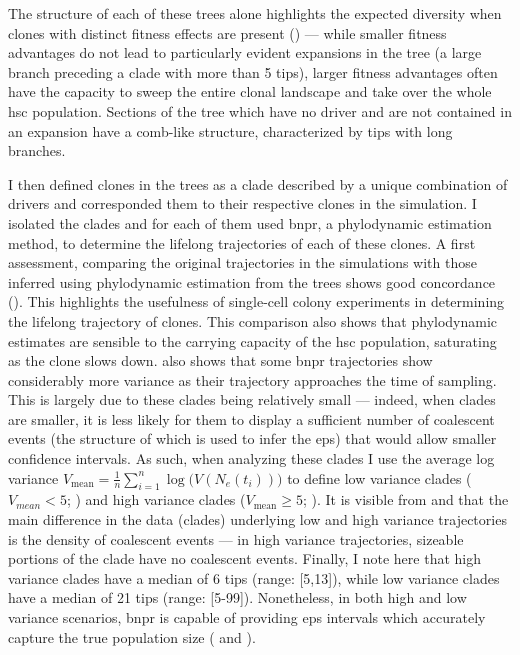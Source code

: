 The structure of each of these trees alone highlights the expected diversity when clones with distinct fitness effects are present () --- while smaller fitness advantages do not lead to particularly evident expansions in the tree (a large branch preceding a clade with more than 5 tips), larger fitness advantages often have the capacity to sweep the entire clonal landscape and take over the whole \ac{hsc} population. Sections of the tree which have no driver and are not contained in an expansion have a comb-like structure, characterized by tips with long branches.

\begin{figure}[!ht]
	\label{fig:trees-simulated-examples}
\end{figure}

I then defined clones in the trees as a clade described by a unique combination of drivers and corresponded them to their respective clones in the simulation. I isolated the clades and for each of them used \ac{bnpr}, a phylodynamic estimation method, to determine the lifelong trajectories of each of these clones. A first assessment, comparing the original trajectories in the simulations with those inferred using phylodynamic estimation from the trees shows good concordance (). This highlights the usefulness of single-cell colony experiments in determining the lifelong trajectory of clones. This comparison also shows that phylodynamic estimates are sensible to the carrying capacity of the \ac{hsc} population, saturating as the clone slows down.  also shows that some \ac{bnpr} trajectories show considerably more variance as their trajectory approaches the time of sampling. This is largely due to these clades being relatively small --- indeed, when clades are smaller, it is less likely for them to display a sufficient number of coalescent events (the structure of which is used to infer the \ac{eps}) that would allow smaller confidence intervals. As such, when analyzing these clades I use the average log variance $V_{\mathrm{mean}} = \frac{1}{n}\sum_{i=1}^{n}{\log(V(N_e(t_i))})$ to define low variance clades ($V_{mean} < 5$; ) and high variance clades ($V_{\mathrm{mean}} \geq 5$; ). It is visible from  and  that the main difference in the data (clades) underlying low and high variance trajectories is the density of coalescent events --- in high variance trajectories, sizeable portions of the clade have no coalescent events. Finally, I note here that high variance clades have a median of 6 tips (range: [5,13]), while low variance clades have a median of 21 tips (range: [5-99]). Nonetheless, in both high and low variance scenarios, \ac{bnpr} is capable of providing \ac{eps} intervals which accurately capture the true population size ( and ). 

